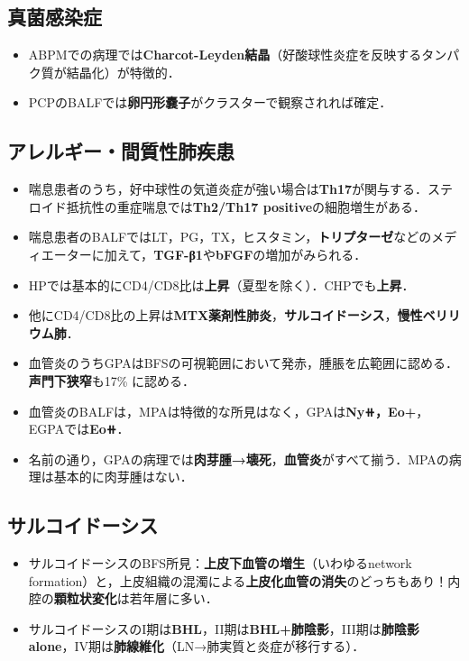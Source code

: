 \subsection{真菌感染症}

\begin{itemize}

\item ABPMでの病理では\textbf{Charcot-Leyden結晶}（好酸球性炎症を反映するタンパク質が結晶化）が特徴的．
\item PCPのBALFでは\textbf{卵円形嚢子}がクラスターで観察されれば確定．
\end{itemize}

\subsection{アレルギー・間質性肺疾患}
\begin{itemize}

\item 喘息患者のうち，好中球性の気道炎症が強い場合は\textbf{Th17}が関与する．ステロイド抵抗性の重症喘息では\textbf{Th2/Th17 positive}の細胞増生がある．
\item 喘息患者のBALFではLT，PG，TX，ヒスタミン，\textbf{トリプターゼ}などのメディエーターに加えて，\textbf{TGF-β1}や\textbf{bFGF}の増加がみられる．
\item HPでは基本的にCD4/CD8比は\textbf{上昇}（夏型を除く）．CHPでも\textbf{上昇}．
\item 他にCD4/CD8比の上昇は\textbf{MTX薬剤性肺炎}，\textbf{サルコイドーシス}，\textbf{慢性ベリリウム肺}．

\item 血管炎のうちGPAはBFSの可視範囲において発赤，腫脹を広範囲に認める．\textbf{声門下狭窄}も17\% に認める．
\item 血管炎のBALFは，MPAは特徴的な所見はなく，GPAは\textbf{Ny⧺，Eo+}，EGPAでは\textbf{Eo⧺}．
\item 名前の通り，GPAの病理では\textbf{肉芽腫→壊死}，\textbf{血管炎}がすべて揃う．MPAの病理は基本的に肉芽腫はない．

\end{itemize}

\subsection{サルコイドーシス}

\begin{itemize}

\item サルコイドーシスのBFS所見：\textbf{上皮下血管の増生}（いわゆるnetwork formation）と，上皮組織の混濁による\textbf{上皮化血管の消失}のどっちもあり！内腔の\textbf{顆粒状変化}は若年層に多い．
\item サルコイドーシスのI期は\textbf{BHL}，II期は\textbf{BHL+肺陰影}，III期は\textbf{肺陰影 alone}，IV期は\textbf{肺線維化}（LN→肺実質と炎症が移行する）．\end{itemize}


